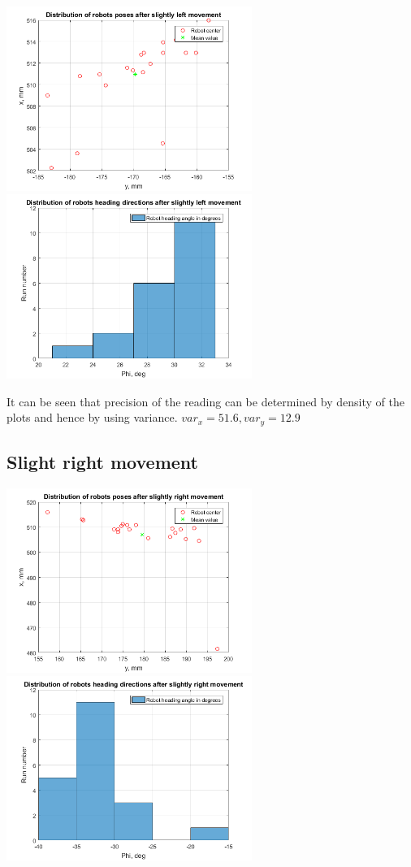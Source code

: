 \documentclass[a4paper, 12pt]{article}
\begin{document}
\begin{center}
  \includegraphics[width=0.6\textwidth]{l}
  \includegraphics[width=0.6\textwidth]{lphi}
\end{center}

It can be seen that precision of the reading can be determined by density of the plots and hence by using variance. $var_x = 51.6,var_y = 12.9$



\newpage

\subsection{Slight right movement}


\begin{center}
  \includegraphics[width=0.6\textwidth]{r}
  \includegraphics[width=0.6\textwidth]{rphi}
\end{center}
\end{document}

